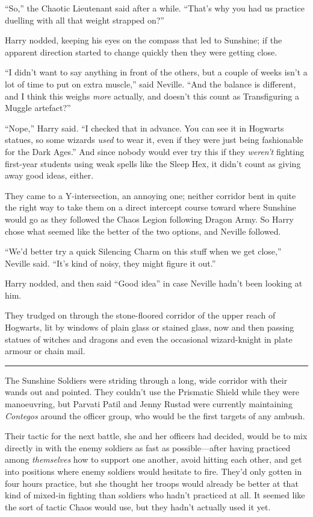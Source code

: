 ``So,'' the Chaotic Lieutenant said after a while. ``That's why you had
us practice duelling with all that weight strapped on?''

Harry nodded, keeping his eyes on the compass that led to Sunshine; if
the apparent direction started to change quickly then they were getting
close.

``I didn't want to say anything in front of the others, but a couple of
weeks isn't a lot of time to put on extra muscle,'' said Neville. ``And
the balance is different, and I think this weighs \emph{more} actually,
and doesn't this count as Transfiguring a Muggle artefact?''

``Nope,'' Harry said. ``I checked that in advance. You can see it in
Hogwarts statues, so some wizards \emph{used} to wear it, even if they
were just being fashionable for the Dark Ages.'' And since nobody would
ever try this if they \emph{weren't} fighting first-year students using
weak spells like the Sleep Hex, it didn't count as giving away good
ideas, either.

They came to a Y-intersection, an annoying one; neither corridor bent in
quite the right way to take them on a direct intercept course toward
where Sunshine would go as they followed the Chaos Legion following
Dragon Army. So Harry chose what seemed like the better of the two
options, and Neville followed.

``We'd better try a quick Silencing Charm on this stuff when we get
close,'' Neville said. ``It's kind of noisy, they might figure it out.''

Harry nodded, and then said ``Good idea'' in case Neville hadn't been
looking at him.

They trudged on through the stone-floored corridor of the upper reach of
Hogwarts, lit by windows of plain glass or stained glass, now and then
passing statues of witches and dragons and even the occasional
wizard-knight in plate armour or chain mail.

\begin{center}\rule{3in}{0.4pt}\end{center}

The Sunshine Soldiers were striding through a long, wide corridor with
their wands out and pointed. They couldn't use the Prismatic Shield
while they were manoeuvring, but Parvati Patil and Jenny Rustad were
currently maintaining \emph{Contegos} around the officer group, who
would be the first targets of any ambush.

Their tactic for the next battle, she and her officers had decided,
would be to mix directly in with the enemy soldiers as fast as
possible---after having practiced among \emph{themselves} how to support
one another, avoid hitting each other, and get into positions where
enemy soldiers would hesitate to fire. They'd only gotten in four hours
practice, but she thought her troops would already be better at that
kind of mixed-in fighting than soldiers who hadn't practiced at all. It
seemed like the sort of tactic Chaos would use, but they hadn't actually
used it yet.

